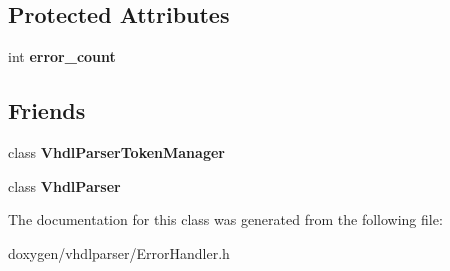 \subsection*{Protected Attributes}
\begin{DoxyCompactItemize}
\item 
\mbox{\label{classvhdl_1_1parser_1_1_error_handler_ada8cb3fd4fa2dead863dc00edc1b9587}} 
int {\bfseries error\+\_\+count}
\end{DoxyCompactItemize}
\subsection*{Friends}
\begin{DoxyCompactItemize}
\item 
\mbox{\label{classvhdl_1_1parser_1_1_error_handler_aff28441094086f5cbf8ee8f34a8bc9a4}} 
class {\bfseries Vhdl\+Parser\+Token\+Manager}
\item 
\mbox{\label{classvhdl_1_1parser_1_1_error_handler_a8bbb7acf78e67f3b3706943bf268ceed}} 
class {\bfseries Vhdl\+Parser}
\end{DoxyCompactItemize}


The documentation for this class was generated from the following file\+:\begin{DoxyCompactItemize}
\item 
doxygen/vhdlparser/Error\+Handler.\+h\end{DoxyCompactItemize}
